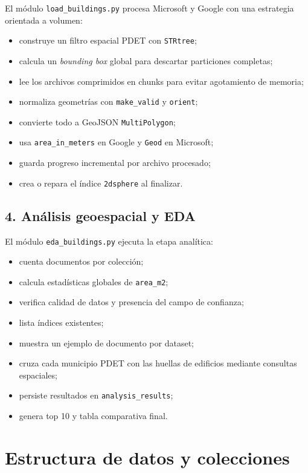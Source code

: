 \documentclass[12pt,a4paper]{article}
\begin{document}
El m\'odulo \texttt{load\_buildings.py} procesa Microsoft y Google con una estrategia orientada a volumen:

\begin{itemize}
  \item construye un filtro espacial PDET con \texttt{STRtree};
  \item calcula un \textit{bounding box} global para descartar particiones completas;
  \item lee los archivos comprimidos en chunks para evitar agotamiento de memoria;
  \item normaliza geometr\'ias con \texttt{make\_valid} y \texttt{orient};
  \item convierte todo a GeoJSON \texttt{MultiPolygon};
  \item usa \texttt{area\_in\_meters} en Google y \texttt{Geod} en Microsoft;
  \item guarda progreso incremental por archivo procesado;
  \item crea o repara el \'indice \texttt{2dsphere} al finalizar.
\end{itemize}

\subsection{4. An\'alisis geoespacial y EDA}

El m\'odulo \texttt{eda\_buildings.py} ejecuta la etapa anal\'itica:

\begin{itemize}
  \item cuenta documentos por colecci\'on;
  \item calcula estad\'isticas globales de \texttt{area\_m2};
  \item verifica calidad de datos y presencia del campo de confianza;
  \item lista \'indices existentes;
  \item muestra un ejemplo de documento por dataset;
  \item cruza cada municipio PDET con las huellas de edificios mediante consultas espaciales;
  \item persiste resultados en \texttt{analysis\_results};
  \item genera top 10 y tabla comparativa final.
\end{itemize}

\section{Estructura de datos y colecciones}
\end{document}

